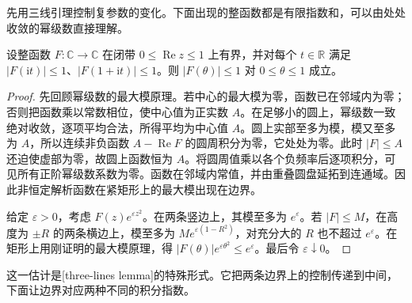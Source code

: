 先用三线引理控制复参数的变化。下面出现的整函数都是有限指数和，可以由处处收敛的幂级数直接理解。

\begin{lemma}[三线引理的有界形式]\label{b2:lem:04-three-lines}
设整函数 \(F:\mathbb C\to\mathbb C\) 在闭带 \(0\leq\operatorname{Re}z\leq1\) 上有界，并对每个 \(t\in\mathbb R\) 满足 \(|F(\mathrm{i}t)|\leq1\)、\(|F(1+\mathrm{i}t)|\leq1\)。则 \(|F(\theta)|\leq1\) 对 \(0\leq\theta\leq1\) 成立。
\end{lemma}
\begin{proof}
先回顾幂级数的最大模原理。若中心的最大模为零，函数已在邻域内为零；否则把函数乘以常数相位，使中心值为正实数 \(A\)。在足够小的圆上，幂级数一致绝对收敛，逐项平均合法，所得平均为中心值 \(A\)。圆上实部至多为模，模又至多为 \(A\)，所以连续非负函数 \(A-\operatorname{Re}F\) 的圆周积分为零，它处处为零。此时 \(|F|\leq A\) 还迫使虚部为零，故圆上函数恒为 \(A\)。将圆周值乘以各个负频率后逐项积分，可见所有正阶幂级数系数为零。函数在邻域内常值，并由重叠圆盘延拓到连通域。因此非恒定解析函数在紧矩形上的最大模出现在边界。

给定 \(\varepsilon>0\)，考虑 \(F(z)e^{\varepsilon z^2}\)。在两条竖边上，其模至多为 \(e^\varepsilon\)。若 \(|F|\leq M\)，在高度为 \(\pm R\) 的两条横边上，模至多为 \(Me^{\varepsilon(1-R^2)}\)，对充分大的 \(R\) 也不超过 \(e^\varepsilon\)。在矩形上用刚证明的最大模原理，得 \(|F(\theta)|e^{\varepsilon\theta^2}\leq e^\varepsilon\)。最后令 \(\varepsilon\downarrow0\)。
\end{proof}

这一估计是[three-lines lemma]的特殊形式。它把两条边界上的控制传递到中间，下面让边界对应两种不同的积分指数。

